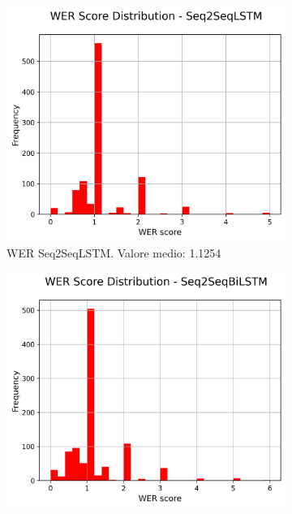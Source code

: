 \begin{figure}[H]
    \centering
    \begin{subfigure}{0.22\textwidth}
        \centering
        \includegraphics[width=\textwidth]{media/Seq2SeqLSTM_wer_scores.png}
        \caption{WER Seq2SeqLSTM. Valore medio: 1.1254}
    \end{subfigure}
    \hfill
    \begin{subfigure}{0.22\textwidth}
        \centering
        \includegraphics[width=\textwidth]{media/Seq2SeqBiLSTM_wer_scores.png}

\end{subfigure}
\end{figure}
